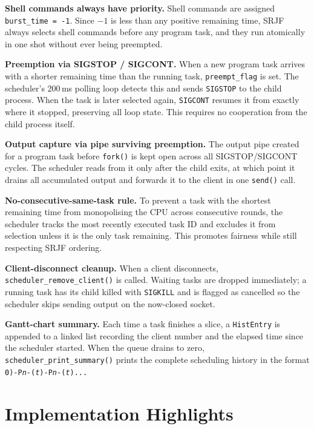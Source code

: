 \documentclass[12pt]{article}
\begin{document}
\textbf{Shell commands always have priority.} Shell commands are assigned
\texttt{burst\_time = -1}. Since $-1$ is less than any positive remaining time, SRJF
always selects shell commands before any program task, and they run atomically in one shot
without ever being preempted.

\textbf{Preemption via SIGSTOP / SIGCONT.} When a new program task arrives with a
shorter remaining time than the running task, \texttt{preempt\_flag} is set. The
scheduler's 200\,ms polling loop detects this and sends \texttt{SIGSTOP} to the child
process. When the task is later selected again, \texttt{SIGCONT} resumes it from exactly
where it stopped, preserving all loop state. This requires no cooperation from the child
process itself.

\textbf{Output capture via pipe surviving preemption.} The output pipe created for a
program task before \texttt{fork()} is kept open across all SIGSTOP/SIGCONT cycles. The
scheduler reads from it only after the child exits, at which point it drains all
accumulated output and forwards it to the client in one \texttt{send()} call.

\textbf{No-consecutive-same-task rule.} To prevent a task with the shortest remaining
time from monopolising the CPU across consecutive rounds, the scheduler tracks the most
recently executed task ID and excludes it from selection unless it is the only task
remaining. This promotes fairness while still respecting SRJF ordering.

\textbf{Client-disconnect cleanup.} When a client disconnects, \texttt{scheduler\_remove\_client()} is called. Waiting tasks are dropped immediately; a running task has its
child killed with \texttt{SIGKILL} and is flagged as cancelled so the scheduler skips
sending output on the now-closed socket.

\textbf{Gantt-chart summary.} Each time a task finishes a slice, a \texttt{HistEntry}
is appended to a linked list recording the client number and the elapsed time since
the scheduler started. When the queue drains to zero, \texttt{scheduler\_print\_summary()}
prints the complete scheduling history in the format
\texttt{0)-P\textit{n}-(\textit{t})-P\textit{n}-(\textit{t})...}

\section{Implementation Highlights}
\end{document}
